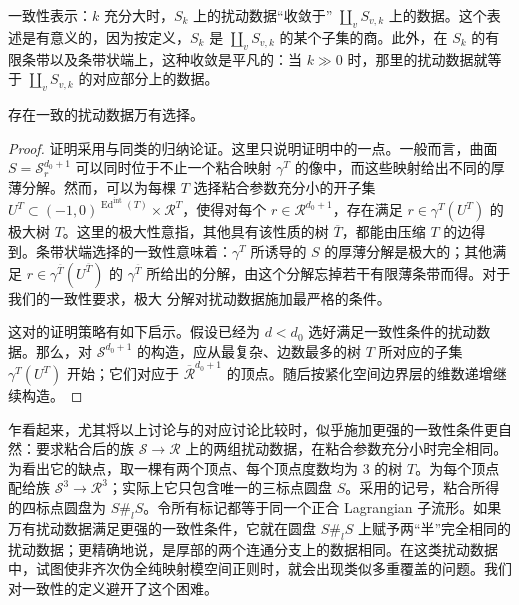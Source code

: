 一致性表示：$k$ 充分大时，$S_k$ 上的扰动数据“收敛于” $\coprod_vS_{v,k}$ 上的数据。这个表述是有意义的，因为按定义，$S_k$ 是 $\coprod_vS_{v,k}$ 的某个子集的商。此外，在 $S_k$ 的有限条带以及条带状端上，这种收敛是平凡的：当 $k\gg0$ 时，那里的扰动数据就等于 $\coprod_vS_{v,k}$ 的对应部分上的数据。
\begin{lemma}\label{st:9.5}
存在一致的扰动数据万有选择。
\end{lemma}
\begin{proof}
证明采用与同类的归纳论证。这里只说明证明中的一点。一般而言，曲面 $S=\mathcal S_r^{d_0+1}$ 可以同时位于不止一个粘合映射 $\gamma^T$ 的像中，而这些映射给出不同的厚薄分解。然而，可以为每棵 $T$ 选择粘合参数充分小的开子集 $U^T\subset(-1,0)^{\operatorname{Ed}^{\mathrm{int}}(T)}\times\mathcal R^T$，使得对每个 $r\in\mathcal R^{d_0+1}$，存在满足 $r\in\gamma^T(U^T)$ 的极大树 $T$。这里的极大性意指，其他具有该性质的树 $\overline T$，都能由压缩 $T$ 的边得到。条带状端选择的一致性意味着：$\gamma^T$ 所诱导的 $S$ 的厚薄分解是极大的；其他满足 $r\in\gamma^{\overline T}(U^{\overline T})$ 的 $\gamma^{\overline T}$ 所给出的分解，由这个分解忘掉若干有限薄条带而得。对于我们的一致性要求，极大
分解对扰动数据施加最严格的条件。

这对的证明策略有如下启示。假设已经为 $d<d_0$ 选好满足一致性条件的扰动数据。那么，对 $\mathcal S^{d_0+1}$ 的构造，应从最复杂、边数最多的树 $T$ 所对应的子集 $\gamma^T(U^T)$ 开始；它们对应于 $\overline{\mathcal R}^{d_0+1}$ 的顶点。随后按紧化空间边界层的维数递增继续构造。
\end{proof}

\begin{note}\label{st:9.6}
乍看起来，尤其将以上讨论与的对应讨论比较时，似乎施加更强的一致性条件更自然：要求粘合后的族 $\mathcal S\to\mathcal R$ 上的两组扰动数据，在粘合参数充分小时完全相同。为看出它的缺点，取一棵有两个顶点、每个顶点度数均为 $3$ 的树 $T$。为每个顶点配给族 $\mathcal S^3\to\mathcal R^3$；实际上它只包含唯一的三标点圆盘 $S$。采用的记号，粘合所得的四标点圆盘为 $S\#_lS$。令所有标记都等于同一个正合 Lagrangian 子流形。如果万有扰动数据满足更强的一致性条件，它就在圆盘 $S\#_lS$ 上赋予两“半”完全相同的扰动数据；更精确地说，是厚部的两个连通分支上的数据相同。在这类扰动数据中，试图使非齐次伪全纯映射模空间正则时，就会出现类似多重覆盖的问题。我们对一致性的定义避开了这个困难。
\end{note}
